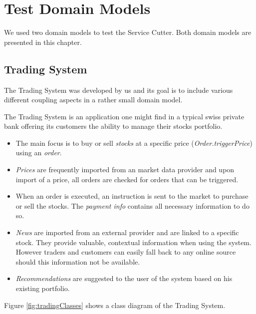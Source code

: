 \chapter{Test Domain Models}
\label{testSystems}

We used two domain models to test the Service Cutter. Both domain models are presented in this chapter.

\section{Trading System}
\label{sec:tradingSystem}

The Trading System was developed by us and its goal is to include various different coupling aspects in a rather small domain model.

The Trading System is an application one might find in a typical swiss private bank offering its customers the ability to manage their stocks portfolio.

\begin{itemize}
\item The main focus is to buy or sell \textit{stocks} at a specific price (\textit{Order.triggerPrice}) using an \textit{order}.
\item \textit{Prices} are frequently imported from an market data provider and upon import of a price, all orders are checked for orders that can be triggered.
\item When an order is executed, an instruction is sent to the market to purchase or sell the stocks. The \textit{payment info} contains all necessary information to do so. 
\item \textit{News} are imported from an external provider and are linked to a specific stock. They provide valuable, contextual information when using the system. However traders and customers can easily fall back to any online source should this information not be available.
\item \textit{Recommendations} are suggested to the user of the system based on his existing portfolio.
\end{itemize}

Figure \ref{fig:tradingClasses} shows a class diagram of the Trading System.

